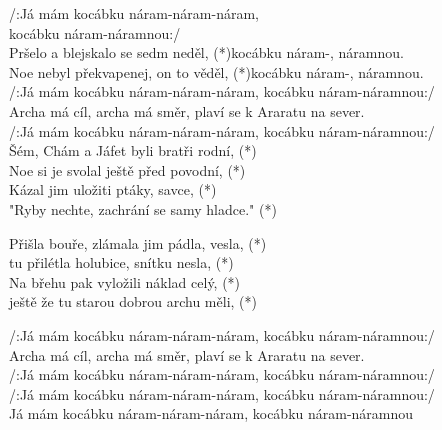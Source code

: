 \cho
/:Já mám kocábku náram-náram-náram,\\
kocábku náram-náramnou:/\\

\ve{}
Pršelo a blejskalo se sedm neděl,  
(*)kocábku náram-, náramnou.\\
Noe nebyl překvapenej, on to věděl,
(*)kocábku náram-, náramnou.\\

\cho{}
/:Já mám kocábku náram-náram-náram, kocábku náram-náramnou:/\\

Archa má cíl, archa má směr, plaví se k Araratu na sever.\\
/:Já mám kocábku náram-náram-náram, kocábku náram-náramnou:/\\

\ve{}
Šém, Chám a Jáfet byli bratři rodní, (*)\\
Noe si je svolal ještě před povodní, (*)\\
Kázal jim uložiti ptáky, savce, (*)\\
"Ryby nechte, zachrání se samy hladce." (*)

\cho{}
\ve{}
Přišla bouře, zlámala jim pádla, vesla, (*)\\
tu přilétla holubice, snítku nesla, (*)\\
Na břehu pak vyložili náklad celý, (*)\\
ještě že tu starou dobrou archu měli, (*)

\cho{}
/:Já mám kocábku náram-náram-náram, kocábku náram-náramnou:/\\

Archa má cíl, archa má směr, plaví se k Araratu na sever.\\
/:Já mám kocábku náram-náram-náram, kocábku náram-náramnou:/\\
/:Já mám kocábku náram-náram-náram, kocábku náram-náramnou:/\\
Já mám kocábku náram-náram-náram, kocábku náram-náramnou\\

\esong